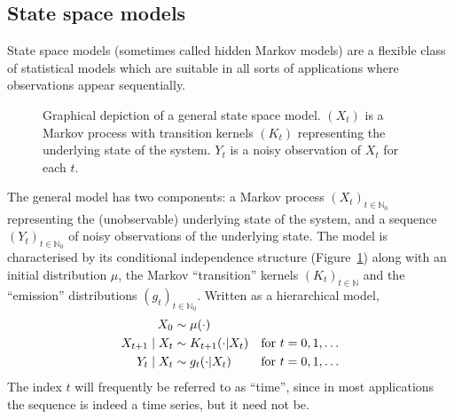 \subsection{State space models}
\label{sec:SSMs}
State space models (sometimes called hidden Markov models) are a flexible class of statistical models which are suitable in all sorts of applications where observations appear sequentially.
\begin{figure}[ht]
\centering
{}
\caption[State space model]{Graphical depiction of a general state space model. $(X_t)$ is a Markov process with transition kernels $(K_t)$ representing the underlying state of the system. $Y_t$ is a noisy observation of $X_t$ for each $t$.}
\label{fig:SSM}
\end{figure}
The general model has two components: a Markov process $(X_t)_{t\in\mathbb{N}_0}$ representing the (unobservable) underlying state of the system, and a sequence $(Y_t)_{t\in\mathbb{N}_0}$ of noisy observations of the underlying state. The model is characterised by its conditional independence structure (Figure~\ref{fig:SSM}) along with an initial distribution $\mu$, the Markov ``transition'' kernels $(K_t)_{t\in\mathbb{N}}$ and the ``emission'' distributions $(g_t)_{t\in\mathbb{N}_0}$. 
Written as a hierarchical model,
\begin{align}
X_0 &\sim \mu(\cdot) & \notag\\
X_{t+1} \mid X_t &\sim K_{t+1}(\cdot | X_t) & \text{for } t=0, 1, \dots
        \label{eq:SSM_spec}\\
Y_t \mid X_t &\sim g_t(\cdot | X_t) & \text{for } t=0, 1, \dots \notag
\end{align}
The index $t$ will frequently be referred to as ``time'', since in most applications the sequence is indeed a time series, but it need not be.

